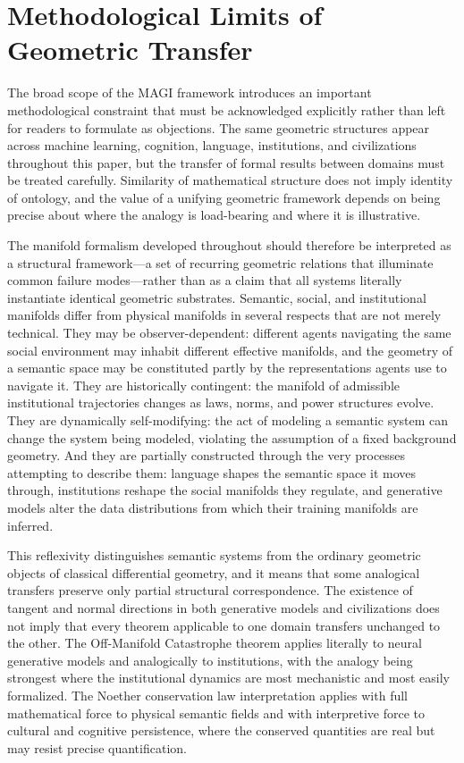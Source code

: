 \documentclass[11pt,a4paper,twocolumn]{article}
\begin{document}

\section{Methodological Limits of Geometric Transfer}

The broad scope of the MAGI framework introduces an important
methodological constraint that must be acknowledged explicitly
rather than left for readers to formulate as objections. The same
geometric structures appear across machine learning, cognition,
language, institutions, and civilizations throughout this paper,
but the transfer of formal results between domains must be treated
carefully. Similarity of mathematical structure does not imply
identity of ontology, and the value of a unifying geometric
framework depends on being precise about where the analogy is
load-bearing and where it is illustrative.

The manifold formalism developed throughout should therefore be
interpreted as a structural framework---a set of recurring geometric
relations that illuminate common failure modes---rather than as a
claim that all systems literally instantiate identical geometric
substrates. Semantic, social, and institutional manifolds differ
from physical manifolds in several respects that are not merely
technical. They may be observer-dependent: different agents
navigating the same social environment may inhabit different
effective manifolds, and the geometry of a semantic space may be
constituted partly by the representations agents use to navigate
it. They are historically contingent: the manifold of admissible
institutional trajectories changes as laws, norms, and power
structures evolve. They are dynamically self-modifying: the act
of modeling a semantic system can change the system being modeled,
violating the assumption of a fixed background geometry. And they
are partially constructed through the very processes attempting
to describe them: language shapes the semantic space it moves
through, institutions reshape the social manifolds they regulate,
and generative models alter the data distributions from which
their training manifolds are inferred.

This reflexivity distinguishes semantic systems from the ordinary
geometric objects of classical differential geometry, and it means
that some analogical transfers preserve only partial structural
correspondence. The existence of tangent and normal directions in
both generative models and civilizations does not imply that every
theorem applicable to one domain transfers unchanged to the other.
The Off-Manifold Catastrophe theorem applies literally to neural
generative models and analogically to institutions, with the
analogy being strongest where the institutional dynamics are most
mechanistic and most easily formalized. The Noether conservation
law interpretation applies with full mathematical force to physical
semantic fields and with interpretive force to cultural and cognitive
persistence, where the conserved quantities are real but may resist
precise quantification.
\end{document}

